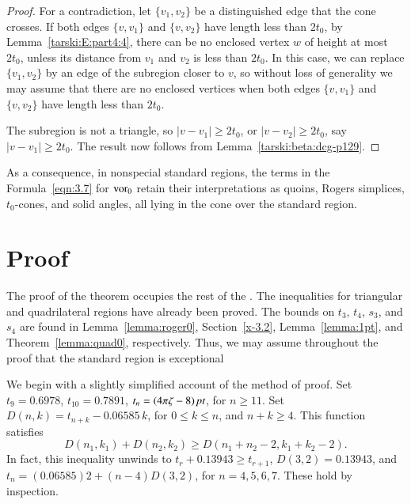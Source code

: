 \begin{proof}
For a contradiction, let $\{v_1,v_2\}$ be a distinguished edge that
the cone crosses. If both edges $\{v,v_1\}$ and $\{v,v_2\}$ have
length less than $2t_0$, by Lemma~\ref{tarski:E:part4:4},
there can be no enclosed vertex $w$ of
height at most $2t_0$, unless its distance from $v_1$ and $v_2$ is
less than $2t_0$.
In this case, we can replace $\{v_1,v_2\}$ by an edge of the
subregion closer to $v$, so without loss of generality we may
assume that there are no enclosed vertices when both edges
$\{v,v_1\}$ and $\{v,v_2\}$ have length less than $2t_0$.

The subregion is not a triangle, so $|v-v_1|\ge 2t_0$, or
$|v-v_2|\ge 2t_0$, say $|v-v_1|\ge 2t_0$.  The result now follows
from Lemma~\ref{tarski:beta:dcg-p129}.
\end{proof}

As a consequence, in nonspecial standard regions, the terms in the
Formula~\ref{eqn:3.7} for $\operatorname{vor}_0$ retain their interpretations as
quoins, Rogers simplices, $t_0$-cones, and solid angles, all lying
in the cone over the standard region.


\section{Proof} %

The proof of the theorem occupies the rest of the \chap. The
inequalities for triangular and quadrilateral regions have already
been proved. The bounds on $t_3$, $t_4$, $s_3$, and $s_4$ are
found in Lemma~\ref{lemma:roger0}, Section~\ref{x-3.2},
Lemma~\ref{lemma:1pt}, and Theorem~\ref{lemma:quad0},
respectively. Thus, we may assume throughout the proof that the
standard region is exceptional

We begin with a slightly simplified account of the method of
proof. Set $t_9=0.6978$, $t_{10}= 0.7891$, $t_n=(4\pi\zeta-8)\,\hbox{\it pt}$, for
$n\ge 11$. Set $D(n,k) = t_{n+k} - 0.06585\,k$, for $0\le k\le n$,
and $n+k\ge 4$. This function satisfies
    \begin{equation}
    D(n_1,k_1)+D(n_2,k_2)\ge D(n_1+n_2-2,k_1+k_2-2).
    \label{eqn:D-superadd}
    \end{equation}
In fact, this inequality unwinds to $t_r+0.13943\ge t_{r+1}$,
$D(3,2)=0.13943$, and $t_n =(0.06585)2+(n-4)D(3,2)$, for $n=4,5,6,7$.
These hold  by inspection.

